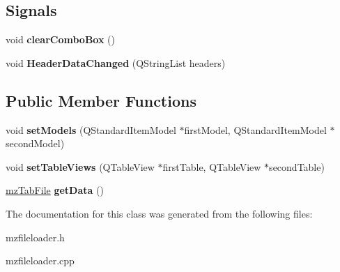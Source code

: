 \subsection*{Signals}
\begin{DoxyCompactItemize}
\item 
\mbox{\label{classmz_file_loader_ad2b2290c7dcf0859f02fd43bc75491a6}} 
void {\bfseries clear\+Combo\+Box} ()
\item 
\mbox{\label{classmz_file_loader_ae659f02714e23607b981617155302f71}} 
void {\bfseries Header\+Data\+Changed} (Q\+String\+List headers)
\end{DoxyCompactItemize}
\subsection*{Public Member Functions}
\begin{DoxyCompactItemize}
\item 
\mbox{\label{classmz_file_loader_a699254cd8dabbf7fda70f02aa06730f7}} 
void {\bfseries set\+Models} (Q\+Standard\+Item\+Model $\ast$first\+Model, Q\+Standard\+Item\+Model $\ast$second\+Model)
\item 
\mbox{\label{classmz_file_loader_a92066953ae94c2cf1e58a2bf4a95c021}} 
void {\bfseries set\+Table\+Views} (Q\+Table\+View $\ast$first\+Table, Q\+Table\+View $\ast$second\+Table)
\item 
\mbox{\label{classmz_file_loader_a495d5ddac38877451d24d974c25f7f11}} 
\mbox{\hyperlink{structmz_tab_file}{mz\+Tab\+File}} {\bfseries get\+Data} ()
\end{DoxyCompactItemize}


The documentation for this class was generated from the following files\+:\begin{DoxyCompactItemize}
\item 
mzfileloader.\+h\item 
mzfileloader.\+cpp\end{DoxyCompactItemize}
